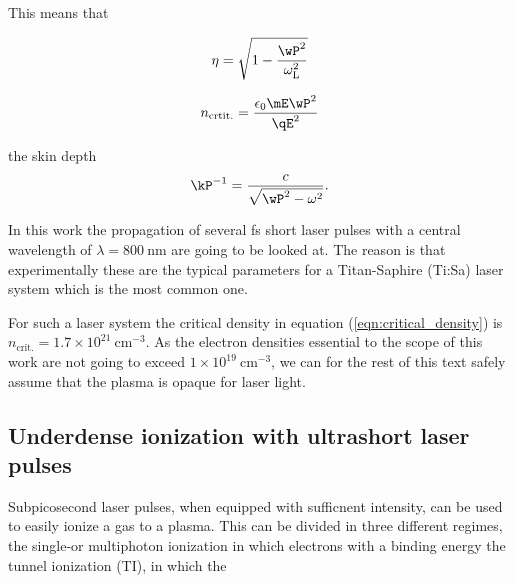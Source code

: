 This means that 

\begin{equation}
\label{eqn:refractive_index_plasma}
\eta = \sqrt{1-\frac{\wP^2}{\omega_\mathrm{L}^2}}
\end{equation}

\begin{equation}
\label{eqn:critical_density}
n_\mathrm{crtit.}=\frac{\epsilon_0 \mE \wP^2}{\qE^2}
\end{equation}

the skin depth 
\begin{equation}
\kP^{-1}=\frac{c}{\sqrt{\wP^2-\omega^2}}.
\end{equation}

In this work the propagation of several fs short laser pulses with a central wavelength of $\lambda = 800\ \mathrm{nm}$ are going to be looked at. The reason is that experimentally these are the typical parameters for a Titan-Saphire (Ti:Sa) laser system which is  the most common one. 

For such a laser system the critical density in equation (\ref{eqn:critical_density}) is $n_\mathrm{crit.}=1.7\times 10^{21}\ \mathrm{cm}^{-3}$.
As the electron densities essential to the scope of this work are not going to exceed $1\times 10^{19}\ \mathrm{cm}^{-3}$, we can for the rest of this text safely assume that the plasma is opaque for laser light.
%
%
%
%




\subsection{Underdense ionization with ultrashort laser pulses}
\label{sec:Theory_ionization}
Subpicosecond laser pulses, when equipped with sufficnent intensity, can be used to easily ionize a gas to a plasma. This can be divided in three different regimes, the single-or multiphoton ionization in which electrons with a binding energy  the tunnel ionization (TI), in which the 


